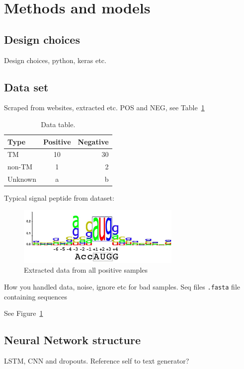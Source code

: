 
\section{Methods and models}

\subsection{Design choices}
Design choices, python, keras etc.


\subsection{Data set}
Scraped from websites, extracted etc. POS and NEG, see Table~\ref{tab:datatable}

\begin{table}[H]
\centering
\begin{tabular}{l | c | r} %
Type & Positive & Negative \\\hline
TM & 10 & 30 \\
non-TM & 1 & 2 \\
Unknown & a & b
\end{tabular}
\caption{\label{tab:datatable}Data table.}
\end{table}

Typical signal peptide from dataset:
\begin{figure}[H]
\centering
\includegraphics[width=0.7\textwidth]{pictures/seqlogo.png}
\caption{\label{fig:seqlogo}Extracted data from all positive samples}
\end{figure}

How you handled data, noise, ignore etc for bad samples. Seq files \verb|.fasta| file containing sequences

 See Figure~\ref{fig:seqlogo}

\subsection{Neural Network structure}
LSTM, CNN and dropouts. Reference self to text generator?

